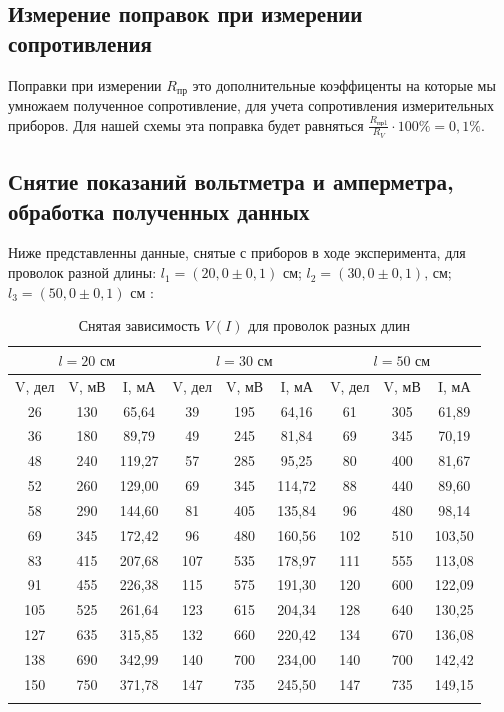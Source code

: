 \documentclass[a4paper, 12pt]{article}
\begin{document}
\subsection{Измерение поправок при измерении сопротивления}

Поправки при измерении $R_\text{пр}$ это дополнительные коэффиценты на которые мы умножаем полученное сопротивление, для учета сопротивления измерительных приборов. Для нашей схемы эта поправка будет равняться $\frac{R_\text{пр1}}{R_V}\cdot 100\% = 0,1\%$.

\subsection{Снятие показаний вольтметра и амперметра, обработка полученных данных}

Ниже представленны данные, снятые с приборов в ходе эксперимента, для проволок разной длины: $l_1=(20,0 \pm 0,1)\text{ см}$; $l_2=(30,0 \pm 0,1) \text{, см}$; $ l_3=(50,0 \pm 0,1)\text{ см}$ :
\begin{longtable}[H]{|c|c|c||c|c|c||c|c|c|}
	\hline
	\multicolumn{3}{|c||}{$l = 20 \text{ см}$} & \multicolumn{3}{c||}{$l = 30 \text{ см}$} & \multicolumn{3}{c|}{$l = 50 \text{ см}$}  \\
	\hline
	V, дел & V, мВ & I, мА & V, дел & V, мВ & I, мА & V, дел & V, мВ & I, мА \\
	\hline
	26 & 130 & 65,64 & 39 & 195 & 64,16 & 61 & 305 & 61,89 \\
	\hline
	36 & 180 & 89,79 & 49 & 245 & 81,84 & 69 & 345 & 70,19 \\
	\hline
	48 & 240 & 119,27 & 57 & 285 & 95,25 & 80 & 400 & 81,67 \\
	\hline
	52 & 260 & 129,00 & 69 & 345 & 114,72 & 88 & 440 & 89,60 \\
	\hline
	58 & 290 & 144,60 & 81 & 405 & 135,84 & 96 & 480 & 98,14 \\
	\hline
	69 & 345 & 172,42 & 96 & 480 & 160,56 & 102 & 510 & 103,50 \\
	\hline
	83 & 415 & 207,68 & 107 & 535 & 178,97 & 111 & 555 & 113,08 \\
	\hline
	91 & 455 & 226,38 & 115 & 575 & 191,30 & 120 & 600 & 122,09 \\
	\hline
	105 & 525 & 261,64 & 123 & 615 & 204,34 & 128 & 640 & 130,25 \\
	\hline
	127 & 635 & 315,85 & 132 & 660 & 220,42 & 134 & 670 & 136,08 \\
	\hline
	138 & 690 & 342,99 & 140 & 700 & 234,00 & 140 & 700 & 142,42 \\
	\hline
	150 & 750 & 371,78 & 147 & 735 & 245,50 & 147 & 735 & 149,15 \\
	\hline
	
	\caption{Снятая зависимость $V(I)$ для проволок разных длин}
\end{longtable}
\end{document}
